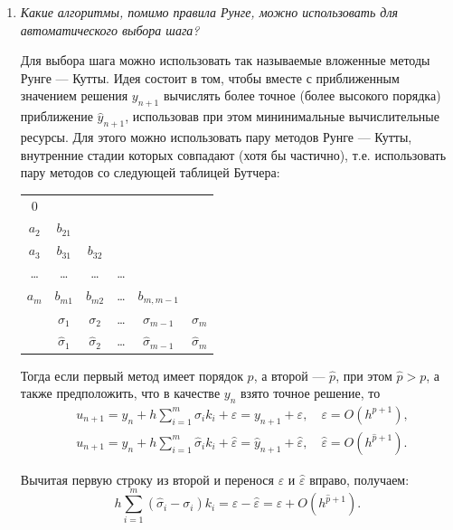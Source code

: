 \documentclass[12pt, a4paper]{article}
\begin{document}
\begin{enumerate}
		\item \textit{Какие алгоритмы, помимо правила Рунге, можно использовать для автоматического выбора шага?}
		\smallskip
		
		Для выбора шага можно использовать так называемые вложенные методы Рунге --- Кутты. Идея состоит в том, чтобы вместе с приближенным значением решения $y_{n+1}$ вычислять более точное (более высокого порядка) приближение $\hat{y}_{n+1}$, использовав при этом мининимальные вычислительные ресурсы. Для этого можно использовать пару методов Рунге --- Кутты, внутренние стадии которых совпадают (хотя бы частично), т.е. использовать пару методов со следующей таблицей Бутчера:
		\begin{table}[h!]
			\centering
			\begin{tabular}{c|ccccc}
				0 &&&&& \\
				$a_2$ & $b_{21}$ &&&& \\
				$a_3$ & $b_{31}$ & $b_{32}$ &&& \\
				\dots & \dots & \dots & \dots && \\
				$a_m$ & $b_{m1}$ & $b_{m2}$ & \dots & $b_{m,m-1}$ &\\
				\hline
				& $\sigma_1$ & $\sigma_2$ & \dots & $\sigma_{m-1}$ & $\sigma_m$ \\
				& $\hat{\sigma}_1$ & $\hat{\sigma}_2$ & \dots & $\hat{\sigma}_{m-1}$ & $\hat{\sigma}_m$ \\
			\end{tabular}
		\end{table}
		
		Тогда если первый метод имеет порядок $p$, а второй --- $\hat{p}$, при этом $\hat{p} > p$, а также предположить, что в качестве $y_n$ взято точное решение, то
		\begin{eqnarray*}
			& u_{n+1} = y_n + h \sum\limits_{i=1}^m \sigma_i k_i + \varepsilon = y_{n+1} + \varepsilon, \quad \varepsilon = O(h^{p+1}), \\
			& u_{n+1} = y_n + h \sum\limits_{i=1}^m \hat{\sigma}_i k_i + \hat{\varepsilon} = \hat{y}_{n+1} + \hat{\varepsilon}, \quad \hat{\varepsilon} = O(h^{\hat{p}+1}).
		\end{eqnarray*}
		
		Вычитая первую строку из второй и перенося $\varepsilon$ и $\hat{\varepsilon}$ вправо, получаем:
		\[
		h \sum\limits_{i=1}^m (\hat{\sigma}_i - \sigma_i) k_i = \varepsilon - \hat{\varepsilon} = \varepsilon + O(h^{\hat{p}+1}).
		\]
		

\end{enumerate}
\end{document}
